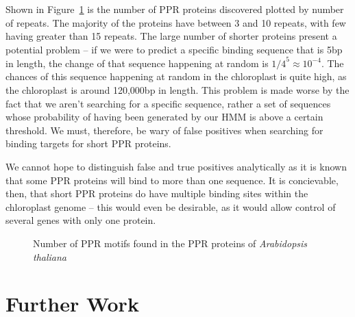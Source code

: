 \documentclass[twoside,a4paper]{article}
\begin{document}
\begin{multicols}{2}
Shown in Figure~\ref{fig:ppr} is the number of PPR proteins discovered plotted
by number of repeats.
The majority of the proteins have between 3 and 10 repeats, with few having
greater than 15 repeats.
The large number of shorter proteins present a potential problem -- if we were
to predict a specific binding sequence that is 5bp in length, the change of
that sequence happening at random is ${1/4}^5 \approx 10^{-4}$.
The chances of this sequence happening at random in the chloroplast is quite
high, as the chloroplast is around 120,000bp in length.
This problem is made worse by the fact that we aren't searching for a specific
sequence, rather a set of sequences whose probability of having been generated
by our HMM is above a certain threshold.
We must, therefore, be wary of false positives when searching for binding 
targets for short PPR proteins.

We cannot hope to distinguish false and true positives analytically as it is
known that some PPR proteins will bind to more than one
sequence\cite{Barkan2012}.
It is concievable, then, that short PPR proteins do have multiple binding sites
within the chloroplast genome -- this would even be desirable, as it would
allow control of several genes with only one protein.

\begin{figure}[H]

  \caption{Number of PPR motifs found in the PPR proteins of
    \textit{Arabidopsis thaliana}}
  \label{fig:ppr}
\end{figure}

\section{Further Work}




\end{multicols}
\end{document}

